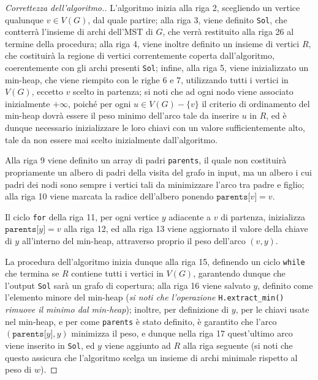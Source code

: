 \documentclass[a4paper, 12pt]{report}
\begin{document}
    \begin{proof}[Correttezza dell'algoritmo.]
        L'algoritmo inizia alla riga 2, scegliendo un vertice qualunque $v \in V(G)$, dal quale partire; alla riga 3, viene definito \texttt{Sol}, che contterrà l'insieme di archi dell'MST di $G$, che verrà restituito alla riga 26 al termine della procedura; alla riga 4, viene inoltre definito un insieme di vertici $R$, che costituirà la regione di vertici correntemente coperta dall'algoritmo, coerentemente con gli archi presenti \texttt{Sol}; infine, alla riga 5, viene inizializzato un min-heap, che viene riempito con le righe 6 e 7, utilizzando tutti i vertici in $V(G)$, eccetto $v$ scelto in partenza; si noti che ad ogni nodo viene associato inizialmente $+ \infty$, poiché per ogni $u \in V(G) - \{v\}$ il criterio di ordinamento del min-heap dovrà essere il peso minimo dell'arco tale da inserire $u$ in $R$, ed è dunque necessario inizializzare le loro chiavi con un valore sufficientemente alto, tale da non essere mai scelto inizialmente dall'algoritmo.

        Alla riga 9 viene definito un array di padri \texttt{parents}, il quale non costituirà propriamente un albero di padri della visita del grafo in input, ma un albero i cui padri dei nodi sono sempre i vertici tali da minimizzare l'arco tra padre e figlio; alla riga 10 viene marcata la radice dell'albero ponendo $\texttt{parents[}v\texttt{]} = v$.

        Il ciclo \texttt{for} della riga 11, per ogni vertice $y$ adiacente a $v$ di partenza, inizializza $\texttt{parents[}y\texttt{]} = v$ alla riga 12, ed alla riga 13 viene aggiornato il valore della chiave di $y$ all'interno del min-heap, attraverso proprio il peso dell'arco $(v, y)$.

        La procedura dell'algoritmo inizia dunque alla riga 15, definendo un ciclo \texttt{while} che termina se $R$ contiene tutti i vertici in $V(G)$, garantendo dunque che l'output \texttt{Sol} sarà un grafo di copertura; alla riga 16 viene salvato $y$, definito come l'elemento minore del min-heap (\textit{si noti che l'operazione} \texttt{H.extract\_min()} \textit{rimuove il minimo dal min-heap}); inoltre, per definizione di $y$, per le chiavi usate nel min-heap, e per come \texttt{parents} è stato definito, è garantito che l'arco $(\texttt{parents[}y\texttt{]}, y)$ minimizza il peso, e dunque nella riga 17 quest'ultimo arco viene inserito in \texttt{Sol}, ed $y$ viene aggiunto ad $R$ alla riga seguente (si noti che questo assicura che l'algoritmo scelga un insieme di archi minimale rispetto al peso di $w$).


\end{proof}
\end{document}
